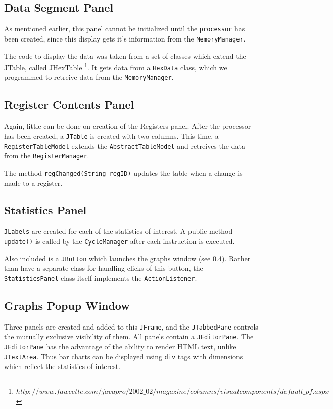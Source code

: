 \subsection{Data Segment Panel}

As mentioned earlier, this panel cannot be initialized until the {\tt processor} has been created, since this display gets it's information from the {\tt MemoryManager}.

The code to display the data was taken from a set of classes which extend the JTable, called JHexTable \footnote{$http://www.fawcette.com/javapro/2002\_02/magazine/columns/visualcomponents/default\_pf.aspx$}. It gets data from a {\tt HexData} class, which we programmed to retreive data from the {\tt MemoryManager}.



\subsection{Register Contents Panel}

Again, little can be done on creation of the Registers panel.  After the processor has been created, a {\tt JTable} is created with two columns. This time, a {\tt RegisterTableModel} extends the {\tt AbstractTableModel} and retreives the data from the {\tt RegisterManager}.

The method {\tt regChanged(String regID)} updates the table when a change is made to a register.




\subsection{Statistics Panel}

{\tt JLabels} are created for each of the statistics of interest. A public method {\tt update()} is called by the {\tt CycleManager} after each instruction is executed.

Also included is a {\tt JButton} which launches the graphs window (see \ref{graphs}). Rather than have a separate class for handling clicks of this button, the {\tt StatisticsPanel} class itself implements the {\tt ActionListener}.



\subsection{Graphs Popup Window}
\label{graphs}

Three panels are created and added to this {\tt JFrame}, and the {\tt JTabbedPane} controls the mutually exclusive visibility of them. All panels contain a {\tt JEditorPane}. The {\tt JEditorPane} has the advantage of the ability to render HTML text, unlike {\tt JTextArea}. Thus bar charts can be displayed using {\tt div} tags with dimensions which reflect the statistics of interest.

